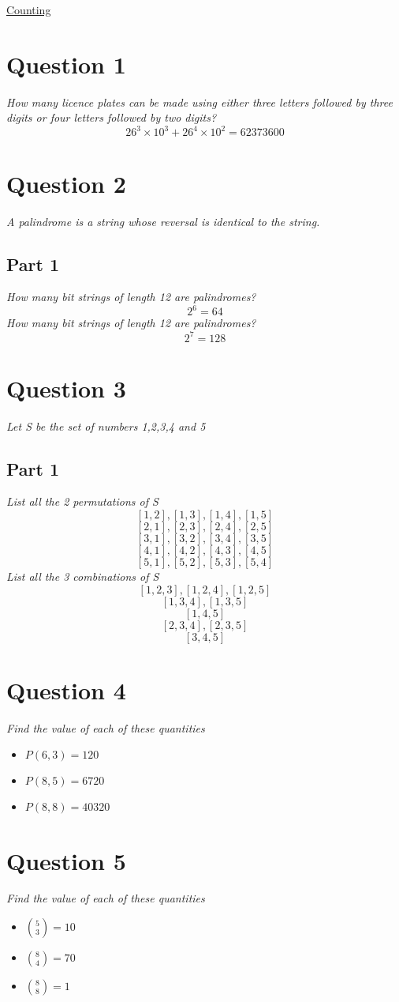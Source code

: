 \documentclass{article}[18pt]
\begin{document}
\begin{center}
\underline{\huge Counting}
\end{center}
\section{Question 1}
\textit{How many licence plates can be made using either three letters followed
by three digits or four letters followed by two digits?}\\
$$26^3\times10^3+26^4\times10^2=62373600$$
\section{Question 2}
\textit{A palindrome is a string whose reversal is identical to the string.}
\subsection{Part 1}
\textit{How many bit strings of length 12 are palindromes?}
$$2^6=64$$
\textit{How many bit strings of length 12 are palindromes?}
$$2^7=128$$
\section{Question 3}
\textit{Let S be the set of numbers 1,2,3,4 and 5}
\subsection{Part 1}
\textit{List all the 2 permutations of S}
$$[1,2],[1,3],[1,4],[1,5]$$
$$[2,1],[2,3],[2,4],[2,5]$$
$$[3,1],[3,2],[3,4],[3,5]$$
$$[4,1],[4,2],[4,3],[4,5]$$
$$[5,1],[5,2],[5,3],[5,4]$$
\textit{List all the 3 combinations of S}
$$[1,2,3],[1,2,4],[1,2,5]$$
$$[1,3,4],[1,3,5]$$
$$[1,4,5]$$
$$[2,3,4],[2,3,5]$$
$$[3,4,5]$$
\section{Question 4}
\textit{Find the value of each of these quantities}
\begin{itemize}
\item $P(6,3)=120$
\item $P(8,5)=6720$
\item $P(8,8)=40320$
\end{itemize}
\section{Question 5}
\textit{Find the value of each of these quantities}
\begin{itemize}
\item $\binom{5}{3}=10$
\item $\binom{8}{4}=70$
\item $\binom{8}{8}=1$
\end{itemize}
\end{document}
